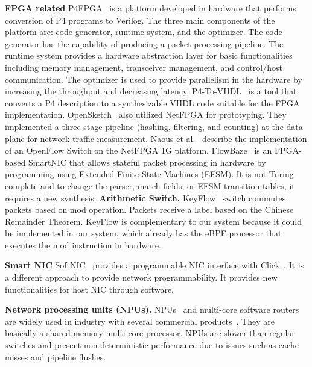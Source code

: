 
\textbf{FPGA related} P4FPGA~\cite{p4fpga} is a platform developed in hardware that performs conversion of P4 programs to Verilog.
The three main components of the platform are: code generator, runtime system, and the optimizer. The code generator has the capability of producing a packet processing pipeline. The runtime system provides a hardware abstraction layer for basic functionalities including memory management, transceiver management, and control/host communication. The optimizer is used to provide parallelism in the hardware by increasing the throughput and decreasing latency.
P4-To-VHDL~\cite{BENACEK201822} is a tool that converts a P4 description to a synthesizable VHDL code suitable for the FPGA implementation.
OpenSketch~\cite{Yu:2013:SDT:2482626.2482631} also utilized NetFPGA for prototyping. They implemented a three-stage pipeline (hashing, filtering, and counting) at the data plane for network traffic measurement. Naous et al.~\cite{Naous:2008:IOS:1477942.1477944} describe the implementation of an OpenFlow Switch on the NetFPGA 1G platform. 
FlowBaze~\cite{FlowBlaze2019} is an FPGA-based SmartNIC that allows stateful packet processing in hardware by programming using Extended Finite State Machines (EFSM). It is not Turing-complete and to change the parser, match fields, or EFSM transition tables, it requires a new synthesis.
\textbf{Arithmetic Switch.} KeyFlow~\cite{Martinello2014KeyFlow}
 switch commutes packets based on mod operation.
Packets receive a label based on the Chinese Remainder Theorem.
KeyFlow is complementary to our system because it could be implemented in our system, which already has the eBPF processor that executes the mod instruction in hardware. 

\textbf{Smart NIC} 
SoftNIC~\cite{Han:EECS-2015-155} provides a programmable NIC interface with Click~\cite{Kohler:2000:CMR:354871.354874}. It is a different approach to provide network programmability. It provides new functionalities for host NIC through software.

\textbf{Network processing units (NPUs).} NPUs~\cite{Sherwood:2003:PMA:859618.859652,Keslassy:2012:PPG:2428663.2428680} 
and multi-core software routers~\cite{Dobrescu:2009:REP:1629575.1629578} are widely used in industry with several commercial products~\cite{intel, cisco, micro, mellanox}. They are basically a shared-memory multi-core processor.  NPUs are slower than regular switches and present non-deterministic performance due to issues such as cache misses and pipeline flushes. 


